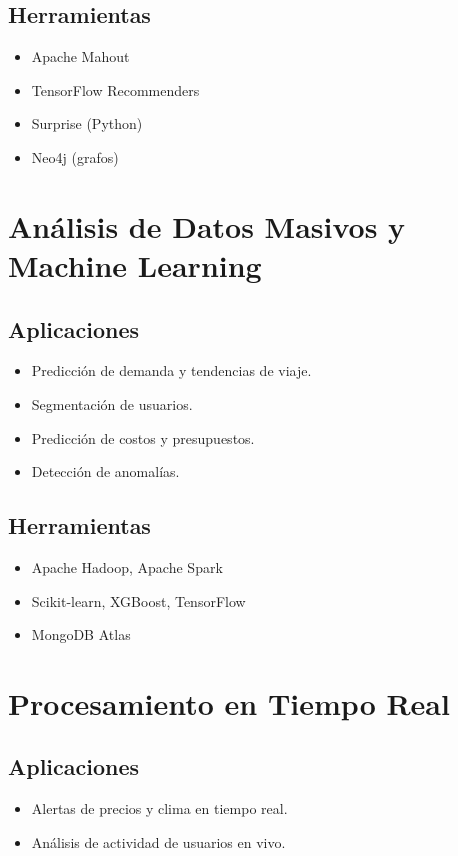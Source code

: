 \documentclass[12pt]{article}
\begin{document}
\subsection{Herramientas}
\begin{itemize}
    \item Apache Mahout
    \item TensorFlow Recommenders
    \item Surprise (Python)
    \item Neo4j (grafos)
\end{itemize}

\section{Análisis de Datos Masivos y Machine Learning}
\subsection{Aplicaciones}
\begin{itemize}
    \item Predicción de demanda y tendencias de viaje.
    \item Segmentación de usuarios.
    \item Predicción de costos y presupuestos.
    \item Detección de anomalías.
\end{itemize}

\subsection{Herramientas}
\begin{itemize}
    \item Apache Hadoop, Apache Spark
    \item Scikit-learn, XGBoost, TensorFlow
    \item MongoDB Atlas
\end{itemize}

\section{Procesamiento en Tiempo Real}
\subsection{Aplicaciones}
\begin{itemize}
    \item Alertas de precios y clima en tiempo real.
    \item Análisis de actividad de usuarios en vivo.
\end{itemize}
\end{document}
